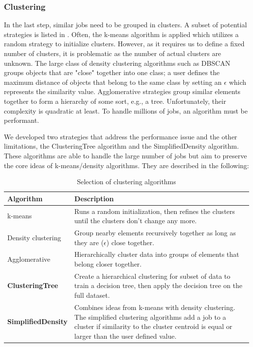 \documentclass[]{llncs}
\begin{document}
\subsubsection{Clustering}
In the last step, similar jobs need to be grouped in clusters.
A subset of potential strategies is listed in .
Often, the k-means algorithm is applied which utilizes a random strategy to initialize clusters.
However, as it requires us to define a fixed number of clusters, it is problematic as the number of actual clusters are unknown.
The large class of density clustering algorithms such as DBSCAN groups objects that are "close" together into one class; a user defines the maximum distance of objects that belong to the same class by setting an $\epsilon$ which represents the similarity value.
Agglomerative strategies group similar elements together to form a hierarchy of some sort, e.g., a tree.
Unfortunately, their complexity is quadratic at least.
To handle millions of jobs, an algorithm must be performant.

We developed two strategies that address the performance issue and the other limitations, the ClusteringTree algorithm and the SimplifiedDensity algorithm.
These algorithms are able to handle the large number of jobs but aim to preserve the core ideas of k-means/density algorithms.
They are described in the following:

\begin{table}
  \centering
  \begin{tabularx}{\textwidth}{lX}
    Algorithm & Description \\
    \hline
    k-means & Runs a random initialization, then refines the clusters until the clusters don't change any more. \\
    \hline
    Density clustering &  Group nearby elements recursively together as long as they are ($\epsilon$) close together. \\
    \hline
    Agglomerative &  Hierarchically cluster data into groups of elements that belong closer together. \\
    \hline
    \textbf{ClusteringTree} &  Create a hierarchical clustering for subset of data to train a decision tree, then apply the decision tree on the full dataset. \\
    \hline
    \textbf{SimplifiedDensity} &  Combines ideas from k-means with density clustering. The simplified clustering algorithms add a job to a cluster if similarity to the cluster centroid is equal or larger than the user defined value. \\
    \hline
  \end{tabularx}
  \caption{Selection of clustering algorithms}
  \label{tab:clustering_algorithms}
\end{table}
\end{document}
